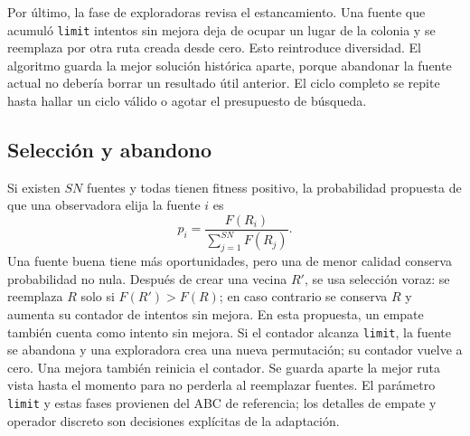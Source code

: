 Por último, la fase de exploradoras revisa el estancamiento. Una fuente que acumuló \texttt{limit} intentos sin mejora deja de ocupar un lugar de la colonia y se reemplaza por otra ruta creada desde cero. Esto reintroduce diversidad. El algoritmo guarda la mejor solución histórica aparte, porque abandonar la fuente actual no debería borrar un resultado útil anterior. El ciclo completo se repite hasta hallar un ciclo válido o agotar el presupuesto de búsqueda.\cite{abc7,abc8}

\subsection{Selección y abandono}
Si existen $SN$ fuentes y todas tienen fitness positivo, la probabilidad propuesta de que una observadora elija la fuente $i$ es
\begin{equation}
p_i=\frac{F(R_i)}{\sum_{j=1}^{SN}F(R_j)}.\label{abc:eq:ruleta}
\end{equation}
Una fuente buena tiene más oportunidades, pero una de menor calidad conserva probabilidad no nula. Después de crear una vecina $R'$, se usa selección voraz: se reemplaza $R$ solo si $F(R')>F(R)$; en caso contrario se conserva $R$ y aumenta su contador de intentos sin mejora. En esta propuesta, un empate también cuenta como intento sin mejora. Si el contador alcanza \texttt{limit}, la fuente se abandona y una exploradora crea una nueva permutación; su contador vuelve a cero. Una mejora también reinicia el contador. Se guarda aparte la mejor ruta vista hasta el momento para no perderla al reemplazar fuentes. El parámetro \texttt{limit} y estas fases provienen del ABC de referencia; los detalles de empate y operador discreto son decisiones explícitas de la adaptación.\cite{abc7,abc8}

